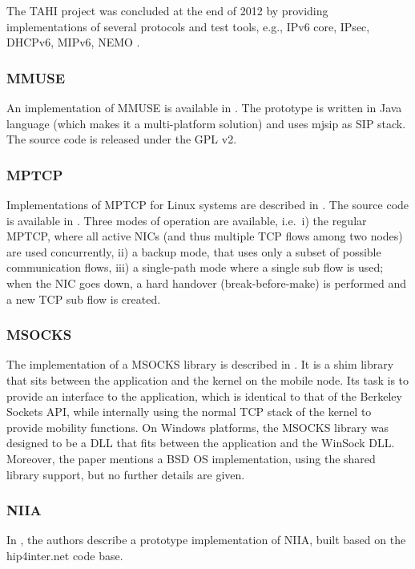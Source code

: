 \documentclass[preprint,12pt]{elsarticle}
\begin{document}
The TAHI project was concluded at the end of 2012 by providing 
implementations of several protocols and test tools, e.g., IPv6 core, IPsec,
DHCPv6, MIPv6, NEMO \cite{tahi}.

\subsubsection*{MMUSE} 
An implementation of MMUSE is available in \cite{mmuse_code}. The prototype is 
written in Java language (which makes it a multi-platform solution) and uses mjsip as SIP 
stack. The source code is released under the \ac{GPL} v2.

\subsubsection*{MPTCP}
Implementations of MPTCP for Linux systems are described in 
\cite{mptcp,Paasch:2012}. The source code is available in \cite{mptcp}.
Three modes of operation are available, i.e.~i) the regular MPTCP, where 
all active NICs (and thus multiple TCP flows among two nodes) are used 
concurrently, ii) a backup mode, that uses only a subset of possible 
communication flows, iii) a single-path mode where a single sub flow is used; 
when the NIC goes down, a hard handover (break-before-make) is performed and a 
new TCP sub flow is created.

\subsubsection*{MSOCKS} 
The implementation of a MSOCKS library is described in \cite{msocks}. It is a 
shim library that sits between the application and the kernel on the mobile 
node. Its task is to provide an interface to the application, which is identical to that 
of the Berkeley Sockets \ac{API}, while internally using the normal TCP stack 
of the 
kernel to provide mobility functions. 
On Windows platforms, the MSOCKS library was designed to be a DLL that fits 
between the application and the WinSock DLL. Moreover, the paper mentions a BSD OS 
implementation, using the shared library support, but no further 
details are given.

\subsubsection*{NIIA} 
In \cite{Schutz20101142}, the authors describe a prototype implementation of NIIA, 
built based on the hip4inter.net code base.
\end{document}
